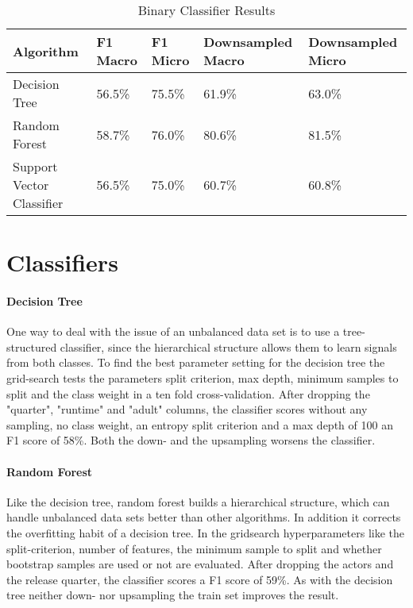 \begin{center}
\begin{table}
	\begin{tabular}{ | p{3.5cm} | p{1.5cm} | p{1.5cm} | p{2cm} | p{2cm} |}
    \hline
    Algorithm & F1 Macro & F1 Micro & Downsampled Macro  & Downsampled Micro\\ \hline
    Decision Tree & 56.5\% & 75.5\% & 61.9\% & 63.0\% \\ \hline
    Random Forest & 58.7\% & 76.0\% & 80.6\% & 81.5\% \\ \hline
    Support Vector Classifier & 56.5\% & 75.0\% & 60.7\% & 60.8\% \\
    \hline
    \end{tabular}
    \caption{Binary Classifier Results} 
    \label{tab:binary_classifier}
\end{table}
\end{center}
\section {Classifiers}
\paragraph{Decision Tree}
One way to deal with the issue of an unbalanced data set is to use a tree-structured classifier, since the hierarchical structure allows them to learn signals from both classes.
To find the best parameter setting for the decision tree the grid-search tests the parameters split criterion, max depth, minimum samples to split and the class weight in a ten fold cross-validation. After dropping the "quarter", "runtime" and "adult" columns, the classifier scores without any sampling, no class weight, an entropy split criterion and a max depth of 100 an F1 score of 58\%. Both the down- and the upsampling worsens the classifier.

\paragraph{Random Forest}
Like the decision tree, random forest builds  a hierarchical structure, which can handle unbalanced data sets better than other algorithms. In addition it corrects the overfitting habit of a decision tree. In the gridsearch hyperparameters like the split-criterion, number of features, the minimum sample to split and whether bootstrap samples are used or not are evaluated. After dropping the actors and the release quarter, the classifier scores a F1 score of 59\%. As with the decision tree neither down- nor upsampling the train set improves the result.

